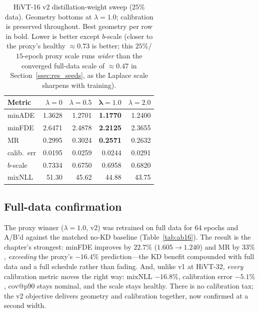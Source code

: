 \begin{table}[htbp]
  \centering
  \caption{HiVT-16 v2 distillation-weight sweep ($25\%$ data). Geometry bottoms at
    $\lambda{=}1.0$; calibration is preserved throughout. Best geometry per row in
    bold. Lower is better except $b$-scale (closer to the proxy's healthy
    $\approx 0.73$ is better; this $25\%$/$15$-epoch proxy scale runs \emph{wider}
    than the converged full-data scale of $\approx 0.47$ in
    Section~\ref{ssec:res_seeds}, as the Laplace scale sharpens with training).}
  \label{tab:kl16}
  \begin{tabular}{lrrrr}
    \toprule
    Metric & $\lambda{=}0$ & $\lambda{=}0.5$ & $\boldsymbol{\lambda{=}1.0}$ & $\lambda{=}2.0$ \\
    \midrule
    minADE      & 1.3628 & 1.2701 & \textbf{1.1770} & 1.2400 \\
    minFDE      & 2.6471 & 2.4878 & \textbf{2.2125} & 2.3655 \\
    MR          & 0.2995 & 0.3024 & \textbf{0.2571} & 0.2632 \\
    calib.\ err & 0.0195 & 0.0259 & 0.0244 & 0.0291 \\
    $b$-scale   & 0.7334 & 0.6750 & 0.6958 & 0.6820 \\
    mixNLL      & 51.30  & 45.62  & 44.88  & 43.75 \\
    \bottomrule
  \end{tabular}
\end{table}

\subsection{Full-data confirmation}
The proxy winner ($\lambda=1.0$, v2) was retrained on full data for $64$ epochs and
A/B'd against the matched no-KD baseline (Table~\ref{tab:ab16}). The result is the
chapter's strongest: minFDE improves by $\mathbf{22.7\%}$ ($1.605\to1.240$) and MR
by $33\%$, \emph{exceeding} the proxy's $-16.4\%$ prediction---the KD benefit
compounded with full data and a full schedule rather than fading. And, unlike v1 at
HiVT-32, \emph{every} calibration metric moves the right way: mixNLL $-16.8\%$,
calibration error $-5.1\%$, cov@p90 stays nominal, and the scale stays healthy.
There is no calibration tax; the v2 objective delivers geometry and calibration
together, now confirmed at a second width.

